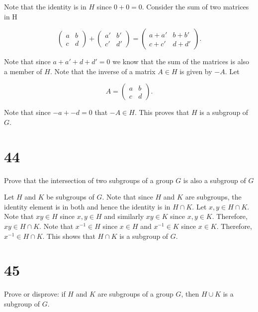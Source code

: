 \documentclass[a4paper]{article}
\begin{document}
Note that the identity is in $H$ since $0 + 0 = 0$. Consider the sum of two matrices in H

$$\begin{pmatrix}
    a & b \\
    c & d
  \end{pmatrix}
  +
  \begin{pmatrix}
    a' & b' \\
    c' & d'
  \end{pmatrix}
  =
  \begin{pmatrix}
    a + a' & b + b' \\
    c + c' & d + d'
  \end{pmatrix}.
$$

Note that since $a + a' + d + d' = 0$ we know that the sum of the matrices is also a member of $H$. Note that the inverse of a matrix $A \in H$ is given by $-A$. Let 

$$A = 
  \begin{pmatrix}
    a & b \\
    c & d
  \end{pmatrix}.
$$

Note that since $-a + -d = 0$ that $-A \in H$. This proves that $H$ is a subgroup of $G$.


\section*{44}

Prove that the intersection of two subgroups of a group $G$ is also a subgroup of $G$

\vspace{\baselineskip}

Let $H$ and $K$ be subgroups of $G$. Note that since $H$ and $K$ are subgroups, the identity element is in both and hence the identity is in $H \cap K$. Let $x,y \in H \cap K$. Note that $xy \in H$ since $x,y \in H$ and similarly $xy \in K$ since $x,y \in K$. Therefore, $xy \in H \cap K$. Note that $x^{-1} \in H$ since $x \in H$ and $x^{-1} \in K$ since $x \in K$. Therefore, $x^{-1} \in H \cap K$. This shows that $H \cap K$ is a subgroup of $G$.



\section*{45}

Prove or disprove: if $H$ and $K$ are subgroups of a group $G$, then $H \cup K$ is a subgroup of $G$.
\end{document}
